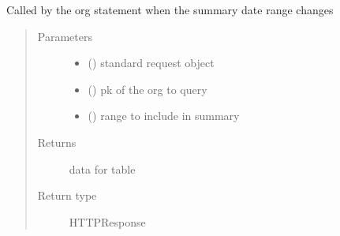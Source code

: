 \documentclass[letterpaper,10pt,english]{sphinxmanual}
\begin{document}

\begin{fulllineitems}
\label{\detokenize{payments:payments.views.statement_org_summary_ajax}}
Called by the org statement when the summary date range changes
\begin{quote}\begin{description}
\item[{Parameters}] \leavevmode\begin{itemize}
\item {} 
 () \textendash{} standard request object

\item {} 
 () \textendash{} pk of the org to query

\item {} 
 () \textendash{} range to include in summary

\end{itemize}

\item[{Returns}] \leavevmode
data for table

\item[{Return type}] \leavevmode
HTTPResponse

\end{description}\end{quote}

\end{fulllineitems}

\end{document}
